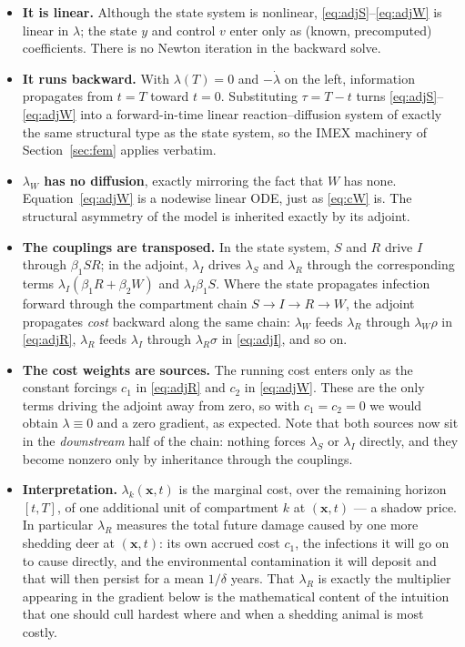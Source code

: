 \documentclass[11pt]{article}
\begin{document}
\begin{itemize}
\item \textbf{It is linear.} Although the state system is nonlinear, \eqref{eq:adjS}--\eqref{eq:adjW} is linear in $\lambda$; the state $y$ and control $v$ enter only as (known, precomputed) coefficients. There is no Newton iteration in the backward solve.

\item \textbf{It runs backward.} With $\lambda(T)=0$ and $-\dot\lambda$ on the left, information propagates from $t=T$ toward $t=0$. Substituting $\tau = T-t$ turns \eqref{eq:adjS}--\eqref{eq:adjW} into a forward-in-time linear reaction--diffusion system of exactly the same structural type as the state system, so the IMEX machinery of Section~\ref{sec:fem} applies verbatim.

\item \textbf{$\lambda_W$ has no diffusion}, exactly mirroring the fact that $W$ has none. Equation~\eqref{eq:adjW} is a nodewise linear ODE, just as \eqref{eq:cW} is. The structural asymmetry of the model is inherited exactly by its adjoint.

\item \textbf{The couplings are transposed.} In the state system, $S$ and $R$ drive $I$ through $\beta_1 SR$; in the adjoint, $\lambda_I$ drives $\lambda_S$ and $\lambda_R$ through the corresponding terms $\lambda_I(\beta_1 R + \beta_2 W)$ and $\lambda_I\beta_1 S$. Where the state propagates infection forward through the compartment chain $S\to I\to R\to W$, the adjoint propagates \emph{cost} backward along the same chain: $\lambda_W$ feeds $\lambda_R$ through $\lambda_W\rho$ in \eqref{eq:adjR}, $\lambda_R$ feeds $\lambda_I$ through $\lambda_R\sigma$ in \eqref{eq:adjI}, and so on.

\item \textbf{The cost weights are sources.} The running cost enters only as the constant forcings $c_1$ in \eqref{eq:adjR} and $c_2$ in \eqref{eq:adjW}. These are the only terms driving the adjoint away from zero, so with $c_1=c_2=0$ we would obtain $\lambda\equiv 0$ and a zero gradient, as expected. Note that both sources now sit in the \emph{downstream} half of the chain: nothing forces $\lambda_S$ or $\lambda_I$ directly, and they become nonzero only by inheritance through the couplings.

\item \textbf{Interpretation.} $\lambda_k(\mathbf{x},t)$ is the marginal cost, over the remaining horizon $[t,T]$, of one additional unit of compartment $k$ at $(\mathbf{x},t)$ --- a shadow price. In particular $\lambda_R$ measures the total future damage caused by one more shedding deer at $(\mathbf{x},t)$: its own accrued cost $c_1$, the infections it will go on to cause directly, and the environmental contamination it will deposit and that will then persist for a mean $1/\delta$ years. That $\lambda_R$ is exactly the multiplier appearing in the gradient below is the mathematical content of the intuition that one should cull hardest where and when a shedding animal is most costly.


\end{itemize}
\end{document}
